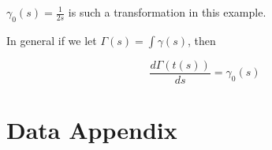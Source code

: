 \documentclass[12pt]{article}
\theoremstyle{definition}
\theoremstyle{definition}
\theoremstyle{definition}
\theoremstyle{definition}
\begin{document}
    $\gamma_0(s) = \frac{1}{2s}$ is such a transformation in this example. 
    
    In general if we let $\Gamma(s) = \int \gamma(s)$, then 
    
    $$ \frac{d \Gamma(t(s)) }{ ds} = \gamma_0(s) $$
    

\begin{table}[ht]
    \centering
    
    \label{tab:teacher_char}
\end{table}








\pagebreak







\appendix
\captionsetup{labelformat=AppendixTables}


\setcounter{figure}{0}   
\setcounter{table}{0}   

\renewcommand{\thetable}{\arabic{table}}
\renewcommand{\thefigure}{\arabic{figure}}



\section{Data Appendix} \label{data_app}
\end{document}
